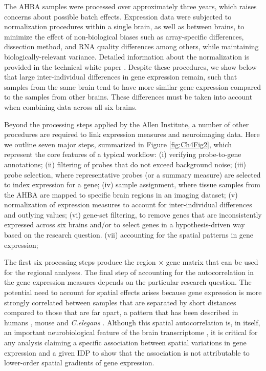 The AHBA samples were processed over approximately three years, which raises concerns about possible batch effects. Expression data were subjected to normalization procedures within a single brain, as well as between brains, to minimize the effect of non-biological biases such as array-specific differences, dissection method, and RNA quality differences among others, while maintaining biologically-relevant variance. Detailed information about the normalization is provided in the technical white paper \citep{AHBAdoc}. Despite these procedures, we show below that large inter-individual differences in gene expression remain, such that samples from the same brain tend to have more similar gene expression compared to the samples from other brains. These differences must be taken into account when combining data across all six brains.

Beyond the processing steps applied by the Allen Institute, a number of other procedures are required to link expression measures and neuroimaging data. Here we outline seven major steps, summarized in Figure \ref{fig:Ch4Fig2}, which represent the core features of a typical workflow:
(i) verifying probe-to-gene annotations;
(ii) filtering of probes that do not exceed background noise;
(iii) probe selection, where representative probes (or a summary measure) are selected to index expression for a gene;
(iv) sample assignment, where tissue samples from the AHBA are mapped to specific brain regions in an imaging dataset;
(v) normalization of expression measures to account for inter-individual differences and outlying values;
(vi) gene-set filtering, to remove genes that are inconsistently expressed across six brains and/or to select genes in a hypothesis-driven way based on the research question.
(vii) accounting for the spatial patterns in gene expression;

The first six processing steps produce the region $\times$ gene matrix that can be used for the regional analyses.
The final step of accounting for the autocorrelation in the gene expression measures depends on the particular research question.
The potential need to account for spatial effects arises because gene expression is more strongly correlated between samples that are separated by short distances compared to those that are far apart, a pattern that has been described in humans
\citep{Richiardi2015,Krienen2016,Vertes2016b,Pantazatos2017}, mouse \citep{Fulcher2016} and \textit{C.elegans} \citep{Arnatkeviciute2018}.
Although this spatial autocorrelation is, in itself, an important neurobiological feature of the brain transcriptome \citep{Gryglewski2018, Fornito2019},
it is critical for any analysis claiming a specific association between spatial variations in gene expression and a given IDP to show that the association is not attributable to lower-order spatial gradients of gene expression.

